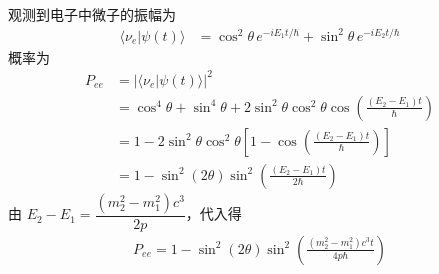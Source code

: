 \begin{enumerate}
{\begin{enumerate}
		观测到电子中微子的振幅为
		\begin{align*}
			\langle\nu_e|\psi(t)\rangle&=\cos^2\theta\,e^{-iE_1 t/\hbar}+\sin^2\theta\,e^{-iE_2 t/\hbar}
		\end{align*}
		概率为
		\begin{align*}
			P_{ee}&=|\langle\nu_e|\psi(t)\rangle|^2\\
			&=\cos^4\theta+\sin^4\theta+2\sin^2\theta\cos^2\theta\cos\!\left(\frac{(E_2-E_1)t}{\hbar}\right)\\
			&=1-2\sin^2\theta\cos^2\theta\left[1-\cos\!\left(\frac{(E_2-E_1)t}{\hbar}\right)\right]\\
			&=1-\sin^2(2\theta)\sin^2\!\left(\frac{(E_2-E_1)t}{2\hbar}\right)
		\end{align*}
		由 $E_2-E_1=\dfrac{(m_2^2-m_1^2)c^3}{2p}$，代入得
		\begin{align*}
			P_{ee}=1-\sin^2(2\theta)\sin^2\!\left(\frac{(m_2^2-m_1^2)c^3 t}{4p\hbar}\right)
		\end{align*}
	\end{enumerate}
	}

\end{enumerate}
